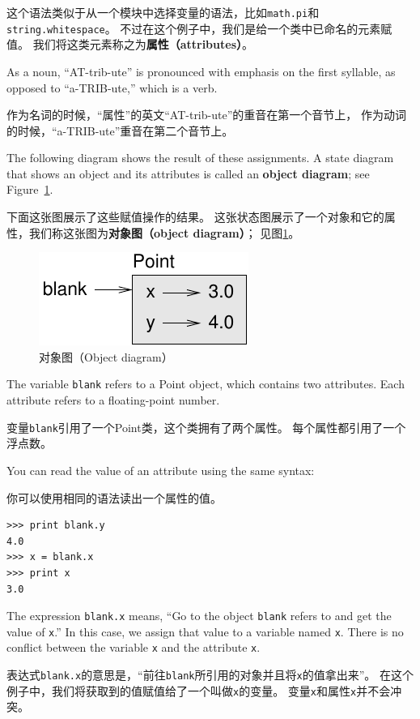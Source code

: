 \documentclass[10pt]{book}
\begin{document}
\begin{CJK}{UTF8}{gbsn}
这个语法类似于从一个模块中选择变量的语法，比如{\tt math.pi}和{\tt string.whitespace}。
不过在这个例子中，我们是给一个类中已命名的元素赋值。
我们将这类元素称之为{\bf 属性（attributes）}。

As a noun, ``AT-trib-ute'' is pronounced with emphasis on the first
syllable, as opposed to ``a-TRIB-ute,'' which is a verb.

作为名词的时候，``属性''的英文``AT-trib-ute''的重音在第一个音节上，
作为动词的时候，``a-TRIB-ute''重音在第二个音节上。

The following diagram shows the result of these assignments.
A state diagram that shows an object and its attributes is
called an {\bf object diagram}; see Figure~\ref{fig.point}.

下面这张图展示了这些赋值操作的结果。
这张状态图展示了一个对象和它的属性，我们称这张图为{\bf 对象图（object diagram）}；
见图\ref{fig.point}。

\begin{figure}
\centerline
{\includegraphics[scale=0.8]{figs/point.pdf}}
\caption{对象图（Object diagram）}
\label{fig.point}
\end{figure}


The variable {\tt blank} refers to a Point object, which
contains two attributes.  Each attribute refers to a
floating-point number.

变量{\tt blank}引用了一个Point类，这个类拥有了两个属性。
每个属性都引用了一个浮点数。

You can read the value of an attribute using the same syntax:

你可以使用相同的语法读出一个属性的值。

\begin{verbatim}
>>> print blank.y
4.0
>>> x = blank.x
>>> print x
3.0
\end{verbatim}
%
The expression {\tt blank.x} means, ``Go to the object {\tt blank}
refers to and get the value of {\tt x}.'' In this case, we assign that
value to a variable named {\tt x}.  There is no conflict between
the variable {\tt x} and the attribute {\tt x}.

表达式{\tt blank.x}的意思是，``前往{\tt blank}所引用的对象并且将{\tt x}的值拿出来''。
在这个例子中，我们将获取到的值赋值给了一个叫做{\tt x}的变量。
变量{\tt x}和属性{\tt x}并不会冲突。


\end{CJK}
\end{document}
